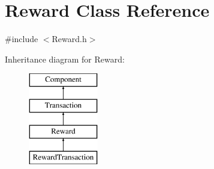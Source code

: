 \hypertarget{classReward}{}\section{Reward Class Reference}
\label{classReward}


{\ttfamily \#include $<$Reward.\+h$>$}

Inheritance diagram for Reward\+:\begin{figure}[H]
\begin{center}
\leavevmode
\includegraphics[height=4.000000cm]{classReward}
\end{center}
\end{figure}
